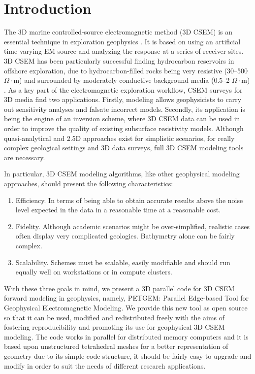 \documentclass[review]{elsarticle}
\begin{document}
\linenumbers
\nolinenumbers
\section{Introduction}
\label{introduction}
The 3D marine controlled-source electromagnetic method (3D CSEM) is an essential technique in exploration geophysics \citep{Constable2010}. It is based on using an artificial time-varying EM source and analyzing the response at a series of receiver sites. 3D CSEM has been particularly successful finding hydrocarbon reservoirs in offshore exploration, due to hydrocarbon-filled rocks being very resistive (30--500 $\Omega \cdot$m) and surrounded by moderately conductive background media (0.5--2 $\Omega \cdot$m) \citep[see e.g.][]{Weiss2006a, Constable2007, Key2009}. As a key part of the electromagnetic exploration workflow, CSEM surveys for 3D media find two applications. Firstly, modeling allows geophysicists to carry out sensitivity analyses and falsate incorrect models. Secondly, its application is being the engine of an inversion scheme, where 3D CSEM data can be used in order to improve the quality of existing subsurface resistivity models. Although quasi-analytical and 2.5D approaches exist for simplistic scenarios, for really complex geological settings and 3D data surveys, full 3D CSEM modeling tools are necessary.

In particular, 3D CSEM modeling algorithms, like other geophysical modeling approaches, should present the following characteristics:
\begin{enumerate}
\item Efficiency. In terms of being able to obtain accurate results above the noise level expected in the data in a reasonable time at a reasonable cost.
\item Fidelity. Although academic scenarios might be over-simplified, realistic cases often display very complicated geologies. Bathymetry alone can be fairly complex. 
\item Scalability. Schemes must be scalable, easily modifiable and should run equally well on workstations or in compute clusters. 
\end{enumerate}
With these three goals in mind, we present a 3D parallel code for 3D CSEM forward modeling in geophysics, namely, PETGEM: Parallel Edge-based Tool for Geophysical Electromagnetic Modeling. We provide this new tool as open source so that it can be used, modified and redistributed freely with the aims of fostering reproducibility and promoting its use for geophysical 3D CSEM modeling. The code works in parallel for distributed memory computers and it is based upon unstructured tetrahedral meshes for a better representation of geometry due to its simple code structure, it should be fairly easy to upgrade and modify in order to suit the needs of different research applications.
\end{document}
